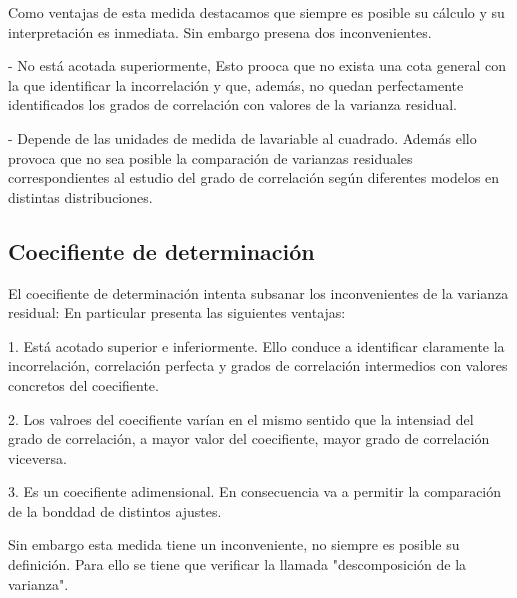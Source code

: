 \documentclass{article}
\begin{document}
\vspace{2mm}

Como ventajas de esta medida destacamos que siempre es posible su cálculo y su interpretación es inmediata. Sin embargo presena dos inconvenientes.

\vspace{2mm}

- No está acotada superiormente, Esto prooca que no exista una cota general con la que identificar la incorrelación y que, además, no quedan perfectamente identificados los grados de correlación con valores de la varianza residual. 

\vspace{2mm}

- Depende de las unidades de medida de lavariable al cuadrado. Además ello provoca que no sea posible la comparación de varianzas residuales correspondientes al estudio del grado de correlación según diferentes modelos en distintas distribuciones.

\subsection{Coecifiente de determinación}

	El coecifiente de determinación intenta subsanar los inconvenientes de la varianza residual: En particular presenta las siguientes ventajas:
	\vspace{2mm}
	
	1. Está acotado superior e inferiormente. Ello conduce a identificar claramente la incorrelación, correlación perfecta y grados de correlación intermedios con valores concretos del coecifiente.
	
	\vspace{2mm}
	
	2. Los valroes del coecifiente varían en el mismo sentido que la intensiad del grado de correlación, a mayor valor del coecifiente, mayor grado de correlación viceversa.
	
	\vspace{2mm}
	
	3. Es un coecifiente adimensional. En consecuencia va a permitir la comparación de la bonddad de distintos ajustes.
	
	\vspace{2mm}
	
	Sin embargo esta medida tiene un inconveniente, no siempre es posible su definición. Para ello se tiene que verificar la llamada "descomposición de la varianza".
	
\end{document}
